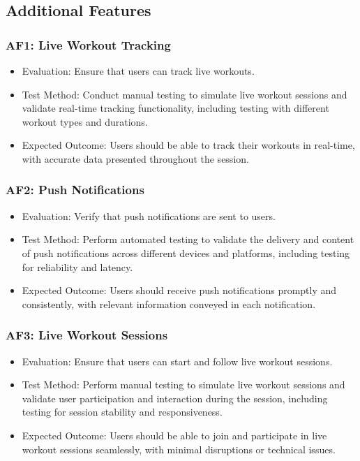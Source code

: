 \documentclass[12pt, titlepage]{article}
\begin{document}
\subsection{Additional Features}

\subsubsection{AF1: Live Workout Tracking}
\begin{itemize}
    \item Evaluation: Ensure that users can track live workouts.
    \item Test Method: Conduct manual testing to simulate live workout sessions and validate real-time tracking functionality, including testing with different workout types and durations.
    \item Expected Outcome: Users should be able to track their workouts in real-time, with accurate data presented throughout the session.
\end{itemize}

\subsubsection{AF2: Push Notifications}
\begin{itemize}
    \item Evaluation: Verify that push notifications are sent to users.
    \item Test Method: Perform automated testing to validate the delivery and content of push notifications across different devices and platforms, including testing for reliability and latency.
    \item Expected Outcome: Users should receive push notifications promptly and consistently, with relevant information conveyed in each notification.
\end{itemize}

\subsubsection{AF3: Live Workout Sessions}
\begin{itemize}
    \item Evaluation: Ensure that users can start and follow live workout sessions.
    \item Test Method: Perform manual testing to simulate live workout sessions and validate user participation and interaction during the session, including testing for session stability and responsiveness.
    \item Expected Outcome: Users should be able to join and participate in live workout sessions seamlessly, with minimal disruptions or technical issues.
\end{itemize}
\end{document}
